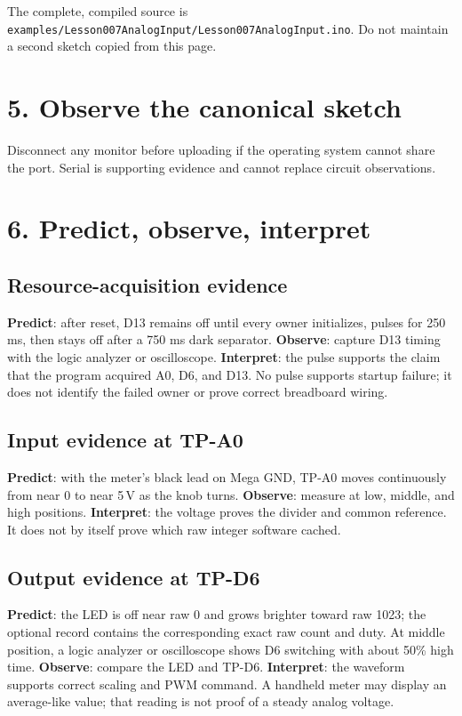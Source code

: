 \documentclass[11pt]{article}
\begin{document}
The complete, compiled source is
\texttt{examples/Lesson007AnalogInput/Lesson007AnalogInput.ino}. Do not maintain
a second sketch copied from this page.

\section*{5. Observe the canonical sketch}


Disconnect any monitor before uploading if the operating system cannot share
the port. Serial is supporting evidence and cannot replace circuit
observations.

\section*{6. Predict, observe, interpret}

\subsection*{Resource-acquisition evidence}

\textbf{Predict}: after reset, D13 remains off until every owner initializes,
pulses for 250 ms, then stays off after a 750 ms dark separator.
\textbf{Observe}: capture D13 timing with the logic analyzer or oscilloscope.
\textbf{Interpret}: the pulse supports the claim that the program acquired
A0, D6, and D13. No pulse supports startup failure; it does not identify the
failed owner or prove correct breadboard wiring.

\subsection*{Input evidence at TP-A0}

\textbf{Predict}: with the meter's black lead on Mega GND, TP-A0 moves
continuously from near 0 to near 5\,V as the knob turns.
\textbf{Observe}: measure at low, middle, and high positions.
\textbf{Interpret}: the voltage proves the divider and common reference. It
does not by itself prove which raw integer software cached.

\subsection*{Output evidence at TP-D6}

\textbf{Predict}: the LED is off near raw 0 and grows brighter toward raw 1023;
the optional record contains the corresponding exact raw count and duty.
At middle position, a logic analyzer or oscilloscope shows D6 switching with
about 50\% high time. \textbf{Observe}: compare the LED and TP-D6.
\textbf{Interpret}: the waveform supports correct scaling and PWM command.
A handheld meter may display an average-like value; that reading is not proof
of a steady analog voltage.
\end{document}
